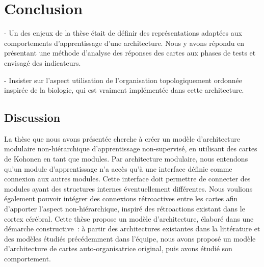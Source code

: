 \chapter*{Conclusion}

- Un des enjeux de la thèse était de définir des représentations adaptées aux comportements d'apprentissage d'une architecture. Nous y avons répondu en présentant une méthode d'analyse des réponses des cartes aux phases de tests et envisagé des indicateurs.

- Insister sur l'aspect utilisation de l'organisation topologiquement ordonnée inspirée de la biologie, qui est vraiment implémentée dans cette architecture.

\section*{Discussion}

La thèse que nous avons présentée cherche à créer un modèle d'architecture modulaire non-hiérarchique d'apprentissage non-supervisé, en utilisant des cartes de Kohonen en tant que modules.
Par architecture modulaire, nous entendons qu'un module d'apprentissage n'a accès qu'à une interface définie comme connexion aux autres modules. Cette interface doit permettre de connecter des modules ayant des structures internes éventuellement différentes.
Nous voulions également pouvoir intégrer des connexions rétroactives entre les cartes afin d'apporter l'aspect non-hiérarchique, inspiré des rétroactions existant dans le cortex cérébral.
Cette thèse propose un modèle d'architecture, élaboré dans une démarche constructive~: à partir des architectures existantes dans la littérature et des modèles étudiés précédemment dans l'équipe, nous avons proposé un modèle d'architecture de cartes auto-organisatrice original, puis avons étudié son comportement.

